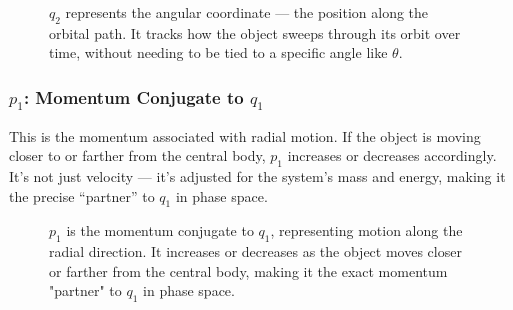 \begin{figure}[H]
\centering
{}
\caption{\( q_2 \) represents the angular coordinate — the position along the orbital path. It tracks how the object sweeps through its orbit over time, without needing to be tied to a specific angle like \( \theta \).}
\end{figure}


\subsubsection{\( p_1 \): Momentum Conjugate to \( q_1 \)} 
    This is the momentum associated with radial motion. If the object is moving closer to or farther from the central body, \( p_1 \) increases or decreases accordingly. It’s not just velocity — it’s adjusted for the system’s mass and energy, making it the precise “partner” to \( q_1 \) in phase space.


\begin{figure}[H]
\centering
{}
\caption{\( p_1 \) is the momentum conjugate to \( q_1 \), representing motion along the radial direction. It increases or decreases as the object moves closer or farther from the central body, making it the exact momentum "partner" to \( q_1 \) in phase space.}
\end{figure}


